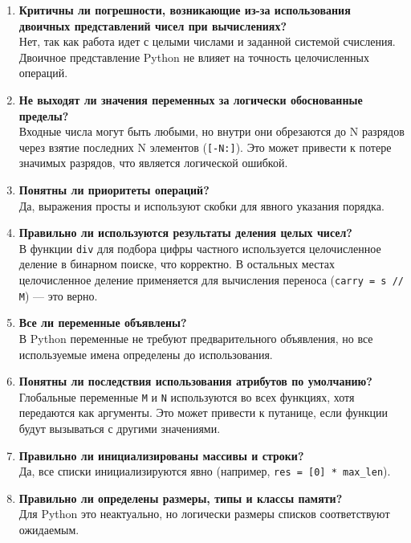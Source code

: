 \documentclass{article}[14pt]
\begin{document}
\begin{enumerate}
\item \textbf{Критичны ли погрешности, возникающие из-за использования двоичных представлений чисел при вычислениях?}
\\
Нет, так как работа идет с целыми числами и заданной системой счисления. Двоичное представление Python не влияет на точность целочисленных операций.

\item \textbf{Не выходят ли значения переменных за логически обоснованные пределы?}
\\
Входные числа могут быть любыми, но внутри они обрезаются до N разрядов через взятие последних N элементов (\texttt{[-N:]}). Это может привести к потере значимых разрядов, что является логической ошибкой.

\item \textbf{Понятны ли приоритеты операций?}
\\
Да, выражения просты и используют скобки для явного указания порядка.

\item \textbf{Правильно ли используются результаты деления целых чисел?}
\\
В функции \texttt{div} для подбора цифры частного используется целочисленное деление в бинарном поиске, что корректно. В остальных местах целочисленное деление применяется для вычисления переноса (\texttt{carry = s // M}) — это верно.

\item \textbf{Все ли переменные объявлены?}
\\
В Python переменные не требуют предварительного объявления, но все используемые имена определены до использования.

\item \textbf{Понятны ли последствия использования атрибутов по умолчанию?}
\\
Глобальные переменные \texttt{M} и \texttt{N} используются во всех функциях, хотя передаются как аргументы. Это может привести к путанице, если функции будут вызываться с другими значениями.

\item \textbf{Правильно ли инициализированы массивы и строки?}
\\
Да, все списки инициализируются явно (например, \texttt{res = [0] * max\_len}).

\item \textbf{Правильно ли определены размеры, типы и классы памяти?}
\\
Для Python это неактуально, но логически размеры списков соответствуют ожидаемым.


\end{enumerate}
\end{document}

